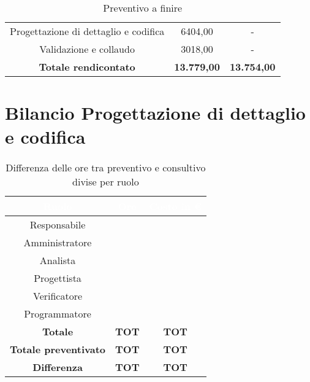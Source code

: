 \begin{flushleft}
\begin{table}[!h]
\begin{center}
\begin{tabular}{ccc}
			Progettazione di dettaglio e codifica    & 6404,00  &  -	\\ 
  
			Validazione e collaudo    & 3018,00 & - 	\\ \hline
  
			\textbf{Totale rendicontato}& \textbf{13.779,00} & \textbf{13.754,00}	\\ \hline   
  
		\end{tabular}
  
		\caption{Preventivo a finire} 
  
	\end{center}
  
\end{table}
\newpage
\section{Bilancio Progettazione di dettaglio e codifica}\label{BilProgDC}
		\begin{table}[!h]
		\begin{center}
			\begin{tabular}{ccc}
				\rowcolor{coolblack}
				\hline
				\textcolor{white}{Ruolo} & \textcolor{white}{Ore} & \textcolor{white}{Costo in \euro}\\
				\hline
				Responsabile   & 	&  	 	\\ 
				Amministratore & 	&  	 	\\ 
				Analista       &   	&     	\\ 
				Progettista    & 	&   	\\ 
				Verificatore   &   	&  		\\ 
				Programmatore  &    &   	\\ \hline
				\textbf{Totale}& \textbf{TOT} & \textbf{TOT}	\\ \hline 
				\textbf{Totale preventivato}& \textbf{TOT} & \textbf{TOT}\\ \hline 
				\textbf{Differenza}& \textbf{TOT} & \textbf{TOT}	\\ \hline  
			\end{tabular}
			
			\caption{Differenza delle ore tra preventivo e consultivo divise per ruolo} 
		\end{center}
	\end{table}

	
	
	\begin{table}[!h]
		\begin{center}
			\begin{tabularx}{\textwidth}{|c|cccccc|c|}
				

\end{tabularx}
\end{center}
\end{table}
\end{flushleft}
